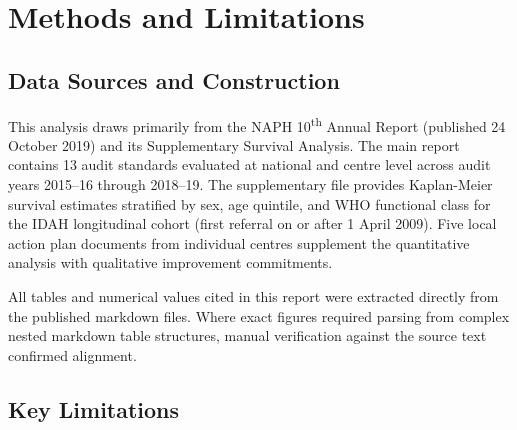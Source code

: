 \documentclass[11pt,a4paper]{article}
\begin{document}
\section{Methods and Limitations}

\subsection{Data Sources and Construction}

This analysis draws primarily from the NAPH 10\textsuperscript{th} Annual Report (published 24 October 2019) and its Supplementary Survival Analysis. The main report contains 13 audit standards evaluated at national and centre level across audit years 2015--16 through 2018--19. The supplementary file provides Kaplan-Meier survival estimates stratified by sex, age quintile, and WHO functional class for the IDAH longitudinal cohort (first referral on or after 1 April 2009). Five local action plan documents from individual centres supplement the quantitative analysis with qualitative improvement commitments.

All tables and numerical values cited in this report were extracted directly from the published markdown files. Where exact figures required parsing from complex nested markdown table structures, manual verification against the source text confirmed alignment.

\subsection{Key Limitations}
\end{document}
